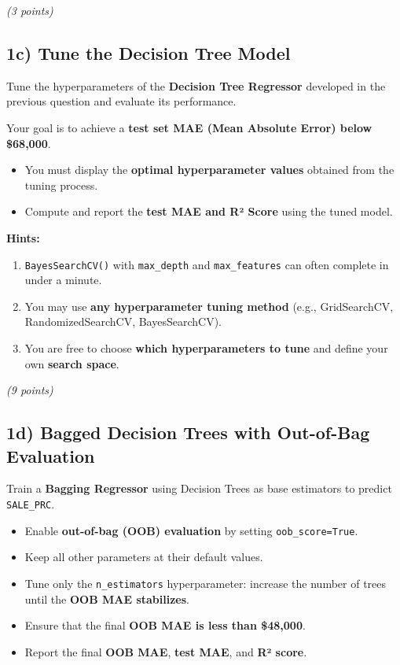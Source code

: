 \documentclass[
  letterpaper,
  DIV=11,
  numbers=noendperiod]{scrreprt}
\providecommand{\tightlist}{%
  \setlength{\itemsep}{0pt}\setlength{\parskip}{0pt}}\usepackage{longtable,booktabs,array}
\begin{document}
\emph{(3 points)}

\subsection{1c) Tune the Decision Tree
Model}\label{c-tune-the-decision-tree-model}

Tune the hyperparameters of the \textbf{Decision Tree Regressor}
developed in the previous question and evaluate its performance.

Your goal is to achieve a \textbf{test set MAE (Mean Absolute Error)
below \$68,000}.

\begin{itemize}
\tightlist
\item
  You must display the \textbf{optimal hyperparameter values} obtained
  from the tuning process.
\item
  Compute and report the \textbf{test MAE and R² Score} using the tuned
  model.
\end{itemize}

\textbf{Hints:}

\begin{enumerate}
\def\labelenumi{\arabic{enumi}.}
\tightlist
\item
  \texttt{BayesSearchCV()} with \texttt{max\_depth} and
  \texttt{max\_features} can often complete in under a minute.
\item
  You may use \textbf{any hyperparameter tuning method} (e.g.,
  GridSearchCV, RandomizedSearchCV, BayesSearchCV).
\item
  You are free to choose \textbf{which hyperparameters to tune} and
  define your own \textbf{search space}.
\end{enumerate}

\emph{(9 points)}

\subsection{1d) Bagged Decision Trees with Out-of-Bag
Evaluation}\label{d-bagged-decision-trees-with-out-of-bag-evaluation}

Train a \textbf{Bagging Regressor} using Decision Trees as base
estimators to predict \texttt{SALE\_PRC}.

\begin{itemize}
\tightlist
\item
  Enable \textbf{out-of-bag (OOB) evaluation} by setting
  \texttt{oob\_score=True}.
\item
  Keep all other parameters at their default values.
\item
  Tune only the \texttt{n\_estimators} hyperparameter: increase the
  number of trees until the \textbf{OOB MAE stabilizes}.
\item
  Ensure that the final \textbf{OOB MAE is less than \$48,000}.
\item
  Report the final \textbf{OOB MAE}, \textbf{test MAE}, and \textbf{R²
  score}.
\end{itemize}
\end{document}
